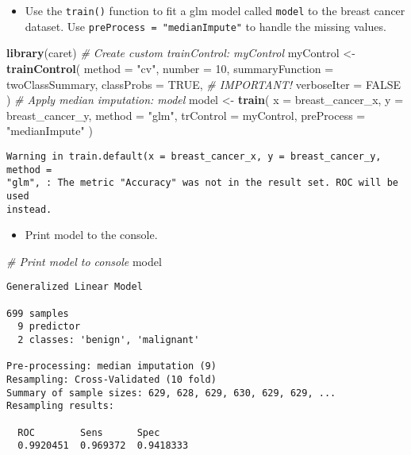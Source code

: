 \documentclass[
]{book}
\newenvironment{Shaded}{\begin{snugshade}}{\end{snugshade}}
\newcommand{\CommentTok}[1]{\textcolor[rgb]{0.56,0.35,0.01}{\textit{#1}}}
\newcommand{\DataTypeTok}[1]{\textcolor[rgb]{0.13,0.29,0.53}{#1}}
\newcommand{\DecValTok}[1]{\textcolor[rgb]{0.00,0.00,0.81}{#1}}
\newcommand{\KeywordTok}[1]{\textcolor[rgb]{0.13,0.29,0.53}{\textbf{#1}}}
\newcommand{\NormalTok}[1]{#1}
\newcommand{\OtherTok}[1]{\textcolor[rgb]{0.56,0.35,0.01}{#1}}
\newcommand{\StringTok}[1]{\textcolor[rgb]{0.31,0.60,0.02}{#1}}
\providecommand{\tightlist}{%
  \setlength{\itemsep}{0pt}\setlength{\parskip}{0pt}}
\begin{document}
\begin{itemize}
\tightlist
\item
  Use the \texttt{train()} function to fit a glm model called \texttt{model} to the breast cancer dataset. Use \texttt{preProcess\ =\ "medianImpute"} to handle the missing values.
\end{itemize}

\begin{Shaded}
\begin{Highlighting}[]
\KeywordTok{library}\NormalTok{(caret)}
\CommentTok{# Create custom trainControl: myControl}
\NormalTok{myControl <-}\StringTok{ }\KeywordTok{trainControl}\NormalTok{(}
  \DataTypeTok{method =} \StringTok{"cv"}\NormalTok{, }
  \DataTypeTok{number =} \DecValTok{10}\NormalTok{,}
  \DataTypeTok{summaryFunction =}\NormalTok{ twoClassSummary,}
  \DataTypeTok{classProbs =} \OtherTok{TRUE}\NormalTok{, }\CommentTok{# IMPORTANT!}
  \DataTypeTok{verboseIter =} \OtherTok{FALSE}
\NormalTok{)}
\CommentTok{# Apply median imputation: model}
\NormalTok{model <-}\StringTok{ }\KeywordTok{train}\NormalTok{(}
  \DataTypeTok{x =}\NormalTok{ breast_cancer_x, }\DataTypeTok{y =}\NormalTok{ breast_cancer_y,}
  \DataTypeTok{method =} \StringTok{"glm"}\NormalTok{,}
  \DataTypeTok{trControl =}\NormalTok{ myControl,}
  \DataTypeTok{preProcess =} \StringTok{"medianImpute"}
\NormalTok{)}
\end{Highlighting}
\end{Shaded}

\begin{verbatim}
Warning in train.default(x = breast_cancer_x, y = breast_cancer_y, method =
"glm", : The metric "Accuracy" was not in the result set. ROC will be used
instead.
\end{verbatim}

\begin{itemize}
\tightlist
\item
  Print model to the console.
\end{itemize}

\begin{Shaded}
\begin{Highlighting}[]
\CommentTok{# Print model to console}
\NormalTok{model}
\end{Highlighting}
\end{Shaded}

\begin{verbatim}
Generalized Linear Model 

699 samples
  9 predictor
  2 classes: 'benign', 'malignant' 

Pre-processing: median imputation (9) 
Resampling: Cross-Validated (10 fold) 
Summary of sample sizes: 629, 628, 629, 630, 629, 629, ... 
Resampling results:

  ROC        Sens      Spec     
  0.9920451  0.969372  0.9418333
\end{verbatim}
\end{document}
